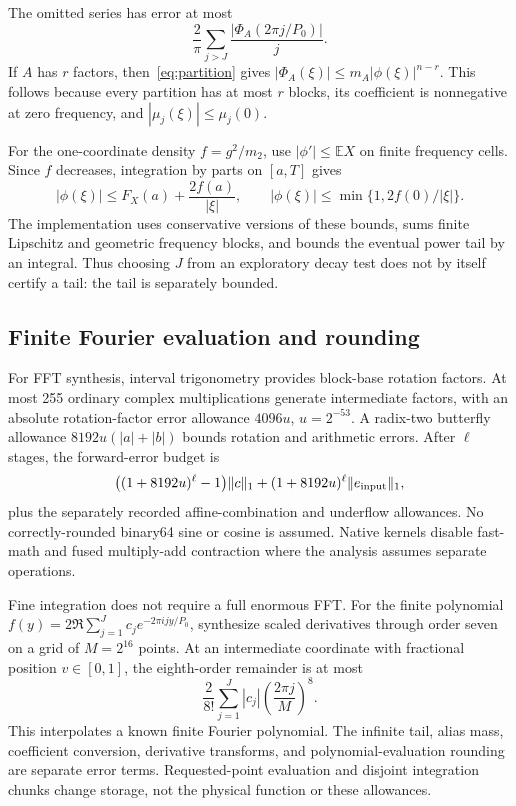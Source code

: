 \documentclass[11pt,a4paper]{article}
\theoremstyle{definition}\newtheorem{definition}[theorem]{Definition}
\theoremstyle{remark}\newtheorem{remark}[theorem]{Remark}
\newcommand{\E}{\mathbb E}\newcommand{\Prob}{\mathbb P}
\numberwithin{equation}{section}
\begin{document}
The omitted series has error at most
\[
 \frac2\pi\sum_{j>J}\frac{|\Phi_A(2\pi j/P_0)|}{j}.
\]
If $A$ has $r$ factors, then~\eqref{eq:partition} gives
$|\Phi_A(\xi)|\le m_A|\phi(\xi)|^{n-r}$. This follows because every partition has at most $r$ blocks, its coefficient is nonnegative at zero frequency, and $|\mu_j(\xi)|\le\mu_j(0)$.

For the one-coordinate density $f=g^2/m_2$, use $|\phi'|\le\E X$ on finite frequency cells. Since $f$ decreases, integration by parts on $[a,T]$ gives
\[
 |\phi(\xi)|\le F_X(a)+\frac{2f(a)}{|\xi|},\qquad
 |\phi(\xi)|\le\min\{1,2f(0)/|\xi|\}.
\]
The implementation uses conservative versions of these bounds, sums finite Lipschitz and geometric frequency blocks, and bounds the eventual power tail by an integral. Thus choosing $J$ from an exploratory decay test does not by itself certify a tail: the tail is separately bounded.

\subsection{Finite Fourier evaluation and rounding}
For FFT synthesis, interval trigonometry provides block-base rotation factors. At most 255 ordinary complex multiplications generate intermediate factors, with an absolute rotation-factor error allowance $4096u$, $u=2^{-53}$. A radix-two butterfly allowance $8192u(|a|+|b|)$ bounds rotation and arithmetic errors. After $\ell$ stages, the forward-error budget is
\begin{equation}\label{eq:fft}
 \bigl((1+8192u)^\ell-1\bigr)\|c\|_1
 +(1+8192u)^\ell\|e_{\rm input}\|_1,
\end{equation}
plus the separately recorded affine-combination and underflow allowances. No correctly-rounded binary64 sine or cosine is assumed. Native kernels disable fast-math and fused multiply-add contraction where the analysis assumes separate operations.

Fine integration does not require a full enormous FFT. For the finite polynomial
$f(y)=2\Re\sum_{j=1}^Jc_je^{-2\pi ijy/P_0}$, synthesize scaled derivatives through order seven on a grid of $M=2^{16}$ points. At an intermediate coordinate with fractional position $v\in[0,1]$, the eighth-order remainder is at most
\begin{equation}\label{eq:taylor}
 \frac2{8!}\sum_{j=1}^J|c_j|\left(\frac{2\pi j}{M}\right)^8.
\end{equation}
This interpolates a known finite Fourier polynomial. The infinite tail, alias mass, coefficient conversion, derivative transforms, and polynomial-evaluation rounding are separate error terms. Requested-point evaluation and disjoint integration chunks change storage, not the physical function or these allowances.
\end{document}

